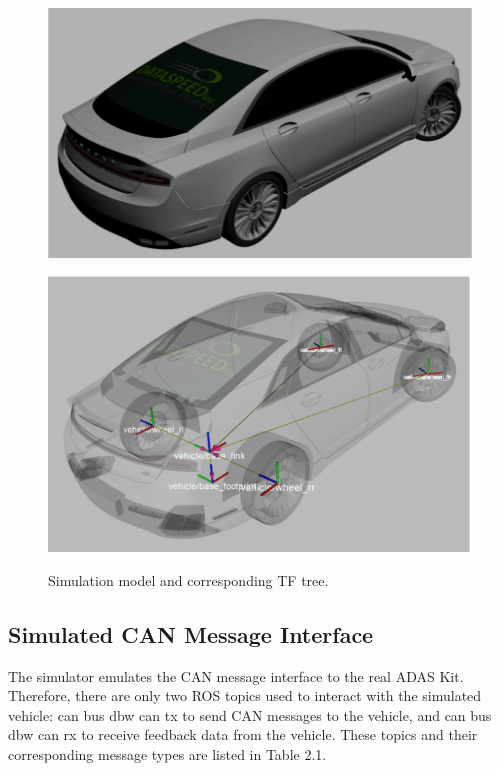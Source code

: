 \begin{figure}
\centering
\begin{minipage}{.5\textwidth}
  \centering
  \includegraphics[width=0.9\linewidth]{figs/ch2/mkz-model}
  \label{fig:sub1}
\end{minipage}%
\begin{minipage}{.5\textwidth}
  \centering
  \includegraphics[width=0.82\linewidth]{figs/ch2/mkz-tf-tree}
  \label{fig:sub2}
\end{minipage}
\caption{Simulation model and corresponding TF tree.}
\label{fig:dataspeed}
\end{figure}

\subsection{Simulated CAN Message Interface}

The simulator emulates the CAN message interface to the real ADAS Kit. Therefore, there are only two ROS topics used to interact with the simulated vehicle: can bus dbw  can tx to send CAN messages to the vehicle, and can bus dbw  can rx to receive feedback data from the vehicle. These topics and their corresponding message types are listed in Table 2.1.

